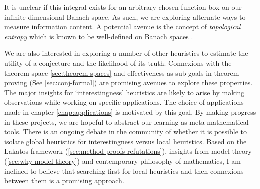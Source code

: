 It is unclear if this integral exists for an arbitrary chosen function box on our infinite-dimensional Banach space. As such, we are exploring alternate ways to measure information content. A potential avenue is the concept of \textit{topological entropy} which is known to be well-defined on Banach spaces \cite{bobokTopologicalEntropyBanach2011}.
\par We are also interested in exploring a number of other heuristics to estimate the utility of a conjecture and the likelihood of its truth. Connexions with the theorem space \ref{sec:theorem-spaces} and effectiveness as sub-goals in theorem proving (See \ref{sec:conj-formal}) are promising avenues to explore these properties. The major insights for `interestingness' heuristics are likely to arise by making observations while working on specific applications. The choice of applications made in chapter \ref{chap:applications} is motivated by this goal. By making progress in these projects, we are hopeful to abstract our learning as meta-mathematical tools. There is an ongoing debate in the community of whether it is possible to isolate global heuristics for interestingness versus local heuristics. Based on the Lakatos framework (\ref{sec:method-proofs-refutations}), insights from model theory (\ref{sec:why-model-theory}) and contemporary philosophy of mathematics, I am inclined to believe that searching first for local heuristics and then connexions between them is a promising approach.

